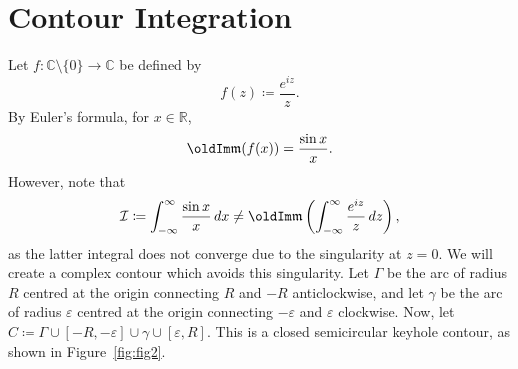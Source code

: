 \documentclass[a4paper]{article}
\newcommand*\diff{\mathop{}\!d} %
\renewcommand{\Im}{\mathop{\oldIm\mathfrak{m}}}
\theoremstyle{definition}
\begin{document}
\section{Contour Integration}

Let $f: \mathbb{C} \setminus \{0\} \to \mathbb{C}$ be defined by
\begin{equation*}
    f(z) \coloneq \frac{e^{iz}}{z}.
\end{equation*}
By Euler's formula, for $x \in \mathbb{R}$,
\begin{equation*}
    \Im (f(x)) = \frac{\sin x}{x}.
\end{equation*}
However, note that
\begin{equation*}
    \mathcal{I} \coloneq \int_{-\infty}^{\infty} \frac{\sin x}{x} \diff x \neq \Im \left( \int_{-\infty}^{\infty} \frac{e^{iz}}{z} \diff z \right),
\end{equation*}
as the latter integral does not converge due to the singularity at $z=0$.
We will create a complex contour which avoids this singularity.
Let $\Gamma$ be the arc of radius $R$ centred at the origin connecting $R$ and $-R$ anticlockwise, and let $\gamma$ be the arc of radius $\varepsilon$ centred at the origin connecting $-\varepsilon$ and $\varepsilon$ clockwise.
Now, let $C \coloneq \Gamma \cup [-R, -\varepsilon] \cup \gamma \cup [\varepsilon, R]$.
This is a closed semicircular keyhole contour, as shown in Figure~\ref{fig:fig2}.
\end{document}
